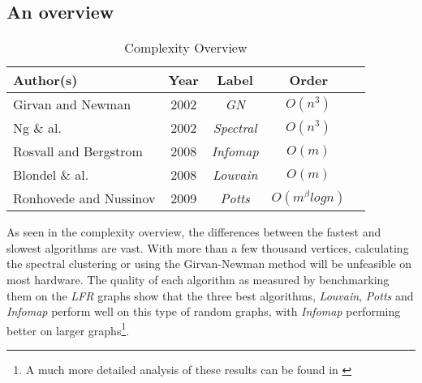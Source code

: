 \subsection{An overview}

\begin{table}
	\small
\begin{tabular}{l*{4}{c}}
	Author(s) & Year & Label & Order \\
	\hline
	\noalign{\smallskip} 
	Girvan and Newman & 2002 & \emph{GN} & $O(n^3)$ \\
	Ng \& al. & 2002 & \emph{Spectral} & $O(n^3)$ \\
	Rosvall and Bergstrom & 2008 & \emph{Infomap} & $O(m)$ \\
	Blondel \& al. & 2008 & \emph{Louvain} & $O(m)$ \\
	Ronhovede and Nussinov & 2009 & \emph{Potts} & $O(m^\beta log n)$ \\
\end{tabular}
\caption{Complexity Overview}
\end{table}

As seen in the complexity overview, the differences between the fastest 
and slowest algorithms are vast. With more than a few thousand vertices, 
calculating the spectral clustering or using the Girvan-Newman method 
will be unfeasible on most hardware. The quality of each algorithm as 
measured by benchmarking them on the \emph{LFR} graphs show that the 
three best algorithms, \emph{Louvain}, \emph{Potts} and \emph{Infomap} 
perform well on this type of random graphs, with \emph{Infomap} 
performing better on larger graphs\footnote{A much more detailed 
analysis of these results can be found in \cite{lancichinetti2009}}. 
